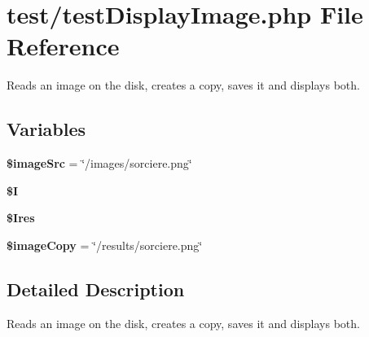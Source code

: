 \hypertarget{test_display_image_8php}{
\section{test/test\-Display\-Image.php \-File \-Reference}
\label{test_display_image_8php}
}


\-Reads an image on the disk, creates a copy, saves it and displays both.  


\subsection*{\-Variables}
\begin{DoxyCompactItemize}
\item 
\hypertarget{test_display_image_8php_a9d054359a14d1487b820d8689d7c74b0}{
{\bfseries \$image\-Src} = \char`\"{}/images/sorciere.\-png\char`\"{}}
\label{test_display_image_8php_a9d054359a14d1487b820d8689d7c74b0}

\item 
{\bfseries \$\-I}
\item 
{\bfseries \$\-Ires}
\item 
\hypertarget{test_display_image_8php_adc04f2d61f4c0f32a2a3ec28ccb06a94}{
{\bfseries \$image\-Copy} = \char`\"{}/results/sorciere.\-png\char`\"{}}
\label{test_display_image_8php_adc04f2d61f4c0f32a2a3ec28ccb06a94}

\end{DoxyCompactItemize}


\subsection{\-Detailed \-Description}
\-Reads an image on the disk, creates a copy, saves it and displays both. 

